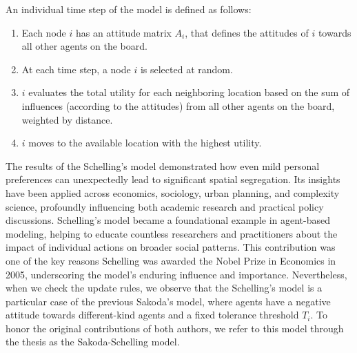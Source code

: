\begin{theorem}
    An individual time step of the model is defined as follows:
    \begin{enumerate}
        \item Each node $i$ has an attitude matrix $A_i$, that defines the attitudes of $i$ towards all other agents on the board.
        \item At each time step, a node $i$ is selected at random.
        \item $i$ evaluates the total utility for each neighboring location based on the sum of influences (according to the attitudes) from all other agents on the board, weighted by distance.
        \item $i$ moves to the available location with the highest utility.
    \end{enumerate}
\end{theorem}

The results of the Schelling's model demonstrated how even mild personal preferences can unexpectedly lead to significant spatial segregation. Its insights have been applied across economics, sociology, urban planning, and complexity science, profoundly influencing both academic research and practical policy discussions. Schelling's model became a foundational example in agent-based modeling, helping to educate countless researchers and practitioners about the impact of individual actions on broader social patterns. This contribution was one of the key reasons Schelling was awarded the Nobel Prize in Economics in 2005, underscoring the model's enduring influence and importance. Nevertheless, when we check the update rules, we observe that the Schelling's model is a particular case of the previous Sakoda's model, where agents have a negative attitude towards different-kind agents and a fixed tolerance threshold $T_i$. To honor the original contributions of both authors, we refer to this model through the thesis as the Sakoda-Schelling model.

